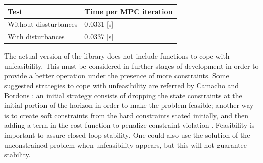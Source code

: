 \begin{center}
    \begin{tabular}{| l | l |}
    \hline
    \textbf{Test} & \textbf{Time per MPC iteration} \\ \hline
    Without dissturbances & 0.0331 [s]\\ \hline
    With disturbances &  0.0337 [s] \\
    \hline
    \end{tabular}
\end{center}

The actual version of the library does not include functions to cope with unfeasibility. This must be considered in further stages of development in order to provide a better operation under the presence of more constraints. Some suggested strategies to cope with unfeasibility are referred by Camacho and Bordons \cite{CamachoBordons}: an initial strategy consists of dropping the state constraints at the initial portion of the horizon in order to make the problem feasible; another way is to create soft constraints from the hard constraints stated initially, and then adding a term in the cost function to penalize constraint violation \cite{Molero2011}. Feasibility is important to assure closed-loop stability. One could also use the solution of the unconstrained problem  when unfeasibility appears, but this will not guarantee stability.\\

  



